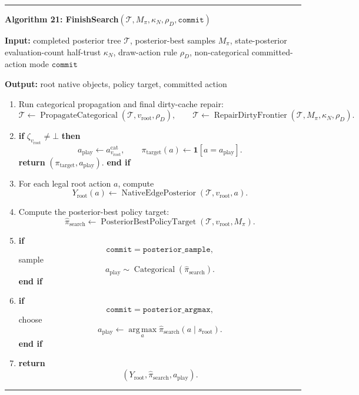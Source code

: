 \documentclass[11pt]{article}
\newcommand{\one}{\mathbf{1}}
\newcommand{\Cat}{\operatorname{Categorical}}
\newcommand{\argmax}{\operatorname*{arg\,max}}
\newcommand{\Tree}{\mathcal{T}}
\newcommand{\PosteriorBestPolicyTarget}{\operatorname{PosteriorBestPolicyTarget}}
\newcommand{\RepairDirtyFrontier}{\operatorname{RepairDirtyFrontier}}
\newcommand{\NativeEdgePosterior}{\operatorname{NativeEdgePosterior}}
\newcommand{\PropagateCategorical}{\operatorname{PropagateCategorical}}
\newenvironment{algorithmblock}[1]
{
  \par\medskip
  \noindent\hrule\par\smallskip
  \noindent\textbf{#1}
  \par\smallskip
}
{
  \par\smallskip\noindent\hrule\par\medskip
}
\newcommand{\Input}{\textbf{Input: }}
\newcommand{\Output}{\textbf{Output: }}
\newcommand{\Return}{\textbf{return }}
\newcommand{\If}{\textbf{if }}
\newcommand{\Then}{\textbf{ then }}
\newcommand{\EndIf}{\textbf{end if}}
\begin{document}
\begin{algorithmblock}{Algorithm 21: FinishSearch\((\Tree,M_\pi,\kappa_N,\rho_D,\texttt{commit})\)}

\Input completed posterior tree \(\Tree\), posterior-best samples \(M_\pi\), state-posterior evaluation-count half-trust \(\kappa_N\), draw-action rule \(\rho_D\), non-categorical committed-action mode \(\texttt{commit}\)

\Output root native objects, policy target, committed action

\begin{enumerate}[leftmargin=2em]
  \item Run categorical propagation and final dirty-cache repair:
  \[
  \Tree\gets\PropagateCategorical(\Tree,v_{\mathrm{root}},\rho_D),
  \qquad
  \Tree\gets\RepairDirtyFrontier(\Tree,M_\pi,\kappa_N,\rho_D).
  \]

  \item \If \(\zeta_{v_{\mathrm{root}}}\ne\bot\) \Then
  \[
  a_{\mathrm{play}}
  \gets
  a_{v_{\mathrm{root}}}^{\mathrm{cat}},
  \qquad
  \pi_{\mathrm{target}}(a)
  \gets
  \one[a=a_{\mathrm{play}}].
  \]
  \Return \((\pi_{\mathrm{target}},a_{\mathrm{play}})\). \EndIf

  \item For each legal root action \(a\), compute
  \[
  Y_{\mathrm{root}}(a)
  \gets
  \NativeEdgePosterior(\Tree,v_{\mathrm{root}},a).
  \]

  \item Compute the posterior-best policy target:
  \[
  \hat{\pi}_{\mathrm{search}}
  \gets
  \PosteriorBestPolicyTarget
  \left(
  \Tree,
  v_{\mathrm{root}},
  M_\pi
  \right).
  \]

  \item \If
  \[
  \texttt{commit}=\texttt{posterior\_sample},
  \]
  sample
  \[
  a_{\mathrm{play}}
  \sim
  \Cat
  \left(
  \hat{\pi}_{\mathrm{search}}
  \right).
  \]
  \EndIf

  \item \If
  \[
  \texttt{commit}=\texttt{posterior\_argmax},
  \]
  choose
  \[
  a_{\mathrm{play}}
  \gets
  \argmax_a
  \hat\pi_{\mathrm{search}}(a\mid s_{\mathrm{root}}).
  \]
  \EndIf

  \item \Return
  \[
  \left(
  Y_{\mathrm{root}},
  \hat{\pi}_{\mathrm{search}},
  a_{\mathrm{play}}
  \right).
  \]
\end{enumerate}

\end{algorithmblock}
\end{document}
